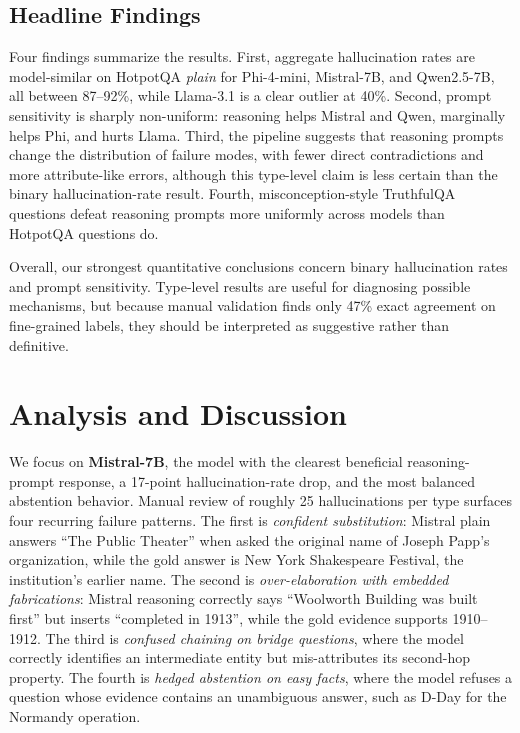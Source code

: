 \documentclass[11pt,a4paper]{article}
\newcommand{\lbl}[1]{\textit{#1}}
\begin{document}
\subsection{Headline Findings}

Four findings summarize the results. First, aggregate hallucination rates are model-similar on HotpotQA \lbl{plain} for Phi-4-mini, Mistral-7B, and Qwen2.5-7B, all between 87--92\%, while Llama-3.1 is a clear outlier at 40\%. Second, prompt sensitivity is sharply non-uniform: reasoning helps Mistral and Qwen, marginally helps Phi, and hurts Llama. Third, the pipeline suggests that reasoning prompts change the distribution of failure modes, with fewer direct contradictions and more attribute-like errors, although this type-level claim is less certain than the binary hallucination-rate result. Fourth, misconception-style TruthfulQA questions defeat reasoning prompts more uniformly across models than HotpotQA questions do.

Overall, our strongest quantitative conclusions concern binary hallucination rates and prompt sensitivity. Type-level results are useful for diagnosing possible mechanisms, but because manual validation finds only 47\% exact agreement on fine-grained labels, they should be interpreted as suggestive rather than definitive.

\section{Analysis and Discussion}
\label{sec:analysis}

We focus on \textbf{Mistral-7B}, the model with the clearest beneficial reasoning-prompt response, a 17-point hallucination-rate drop, and the most balanced abstention behavior. Manual review of roughly 25 hallucinations per type surfaces four recurring failure patterns. The first is \textit{confident substitution}: Mistral plain answers ``The Public Theater'' when asked the original name of Joseph Papp's organization, while the gold answer is New York Shakespeare Festival, the institution's earlier name. The second is \textit{over-elaboration with embedded fabrications}: Mistral reasoning correctly says ``Woolworth Building was built first'' but inserts ``completed in 1913'', while the gold evidence supports 1910--1912. The third is \textit{confused chaining on bridge questions}, where the model correctly identifies an intermediate entity but mis-attributes its second-hop property. The fourth is \textit{hedged abstention on easy facts}, where the model refuses a question whose evidence contains an unambiguous answer, such as D-Day for the Normandy operation.
\end{document}
